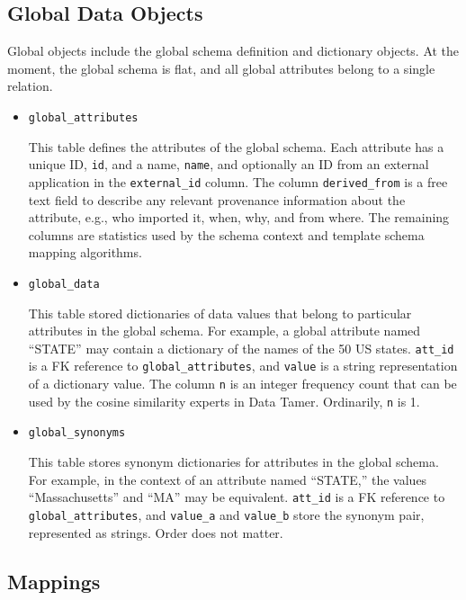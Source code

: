 \documentclass[12pt]{article}
\begin{document}
\subsection{Global Data Objects}

Global objects include the global schema definition and dictionary objects.  At the moment, the global schema is flat, and all global attributes belong to a single relation.

\begin{itemize}

\item \texttt{global\_attributes}

This table defines the attributes of the global schema.  Each attribute has a unique ID, \texttt{id}, and a name, \texttt{name}, and optionally an ID from an external application in the \texttt{external\_id} column.  The column \texttt{derived\_from} is a free text field to describe any relevant provenance information about the attribute, e.g., who imported it, when, why, and from where.  The remaining columns are statistics used by the schema context and template schema mapping algorithms.

\item \texttt{global\_data}

This table stored dictionaries of data values that belong to particular attributes in the global schema.  For example, a global attribute named ``STATE'' may contain a dictionary of the names of the 50 US states.  \texttt{att\_id} is a FK reference to \texttt{global\_attributes}, and \texttt{value} is a string representation of a dictionary value.  The column \texttt{n} is an integer frequency count that can be used by the cosine similarity experts in Data Tamer.  Ordinarily, \texttt{n} is 1.

\item \texttt{global\_synonyms}

This table stores synonym dictionaries for attributes in the global schema.  For example, in the context of an attribute named ``STATE,'' the values ``Massachusetts'' and ``MA'' may be equivalent.  \texttt{att\_id} is a FK reference to \texttt{global\_attributes}, and \texttt{value\_a} and \texttt{value\_b} store the synonym pair, represented as strings.  Order does not matter.

\end{itemize}


\subsection{Mappings}
\end{document}
